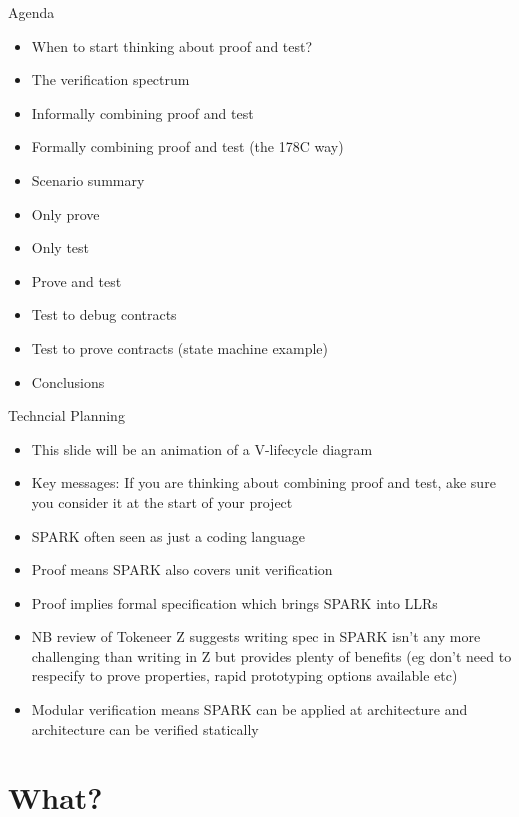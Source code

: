 \documentclass{beamer}
\begin{document}
\begin{frame}[fragile]{Agenda}
  \begin{itemize}
     \item When to start thinking about proof and test?
     \item The verification spectrum
     \item Informally combining proof and test
     \item Formally combining proof and test (the 178C way)
     \item Scenario summary
     \item Only prove
     \item Only test
     \item Prove and test
     \item Test to debug contracts
     \item Test to prove contracts (state machine example)
     \item Conclusions
  \end{itemize}
\end{frame}

\begin{frame}[fragile]{Techncial Planning}
  \begin{itemize}
      \item This slide will be an animation of a V-lifecycle diagram
      \item Key messages: If you are thinking about combining proof and test, ake sure you consider it at the start of your project
      \item SPARK often seen as just a coding language
      \item Proof means SPARK also covers unit verification
      \item Proof implies formal specification which brings SPARK into LLRs
      \item NB review of Tokeneer Z suggests writing spec in SPARK isn't any more challenging than writing in Z but provides plenty of benefits (eg don't need to respecify to prove properties, rapid prototyping options available etc)
      \item Modular verification means SPARK can be applied at architecture and architecture can be verified statically

  \end{itemize}
\end{frame}

\section{What?}
\end{document}

